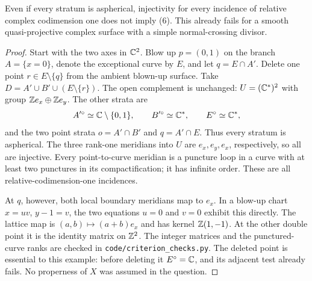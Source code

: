 \begin{proposition}\label{P1b2}
Even if every stratum is aspherical, injectivity for every incidence of
relative complex codimension one does not imply (6).  This already
fails for a smooth quasi-projective complex surface with a simple
normal-crossing divisor.
\end{proposition}
\begin{proof}
Start with the two axes in $\mathbb C^2$.  Blow up $p=(0,1)$ on the branch
$A=\{x=0\}$, denote the exceptional curve by $E$, and let
$q=E\cap A'$.  Delete one point $r\in E\setminus\{q\}$ from the
ambient blown-up surface.  Take $D=A'\cup B'\cup(E\setminus\{r\})$.
The open complement is unchanged: $U=(\mathbb C^*)^2$ with group
$\mathbb Z e_x\oplus\mathbb Z e_y$.  The other strata are
\[
 A'^\circ\simeq\mathbb C\setminus\{0,1\},\qquad
 B'^\circ\simeq\mathbb C^*,\qquad E^\circ\simeq\mathbb C^*,
\]
and the two point strata $o=A'\cap B'$ and $q=A'\cap E$.
Thus every stratum is aspherical.  The three rank-one meridians into
$U$ are $e_x,e_y,e_x$, respectively, so all are injective.
Every point-to-curve meridian is a puncture loop in a curve with at
least two punctures in its compactification; it has infinite order.
These are all relative-codimension-one incidences.

At $q$, however, both local boundary meridians map to $e_x$.  In a
blow-up chart $x=uv$, $y-1=v$, the two equations $u=0$ and $v=0$
exhibit this directly.  The lattice map is
$(a,b)\mapsto(a+b)e_x$ and has kernel $\mathbb Z(1,-1)$.
At the other double point it is the identity matrix on $\mathbb Z^2$.
The integer matrices and the punctured-curve ranks are checked in
\texttt{code/criterion\_checks.py}.  The deleted point is essential to
this example: before deleting it $E^\circ=\mathbb C$, and its adjacent test
already fails.  No properness of $X$ was assumed in the question.
\end{proof}


